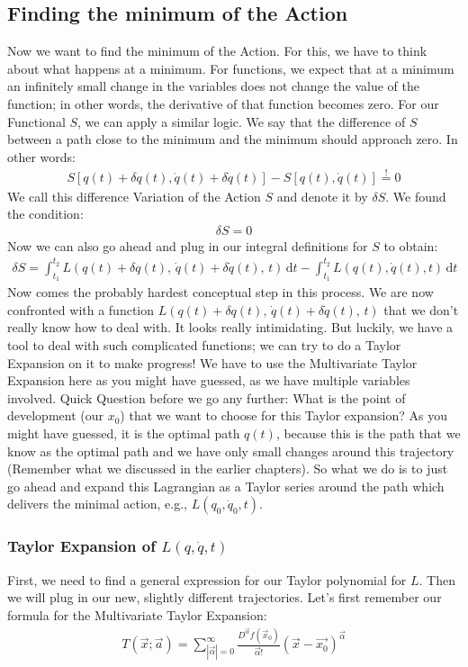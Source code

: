 \subsection*{Finding the minimum of the Action}
    Now we want to find the minimum of the Action. For this, we have to think about what happens at a minimum. For functions, we expect that at a minimum an infinitely small change in the variables does not change the value of the function; in other words, the derivative of that function becomes zero. For our Functional $S$, we can apply a similar logic. We say that the difference of $S$ between a path close to the minimum and the minimum should approach zero. In other words:
    \begin{align}
        S[q(t)+\delta q(t), \dot{q}(t)+\delta \dot{q}(t)] - S[q(t), \dot{q}(t)]  \overset{!}{=} 0
    \end{align}
    We call this difference Variation of the Action $S$ and denote it by $\delta S$. We found the condition:
    \begin{align}
        \delta S = 0
    \end{align}
    Now we can also go ahead and plug in our integral definitions for $S$ to obtain:
    \begin{align}
        \delta S=\int_{t_1}^{t_2} L(q(t)+\delta q(t),\,\dot{q}(t)+\delta \dot{q}(t),\, t)\,\text{d}t - \int_{t_1}^{t_2} L(q(t), \dot{q}(t), t)\,\text{d}t
    \end{align}
    Now comes the probably hardest conceptual step in this process. We are now confronted with a function $L(q(t)+\delta q(t),\,\dot{q}(t)+\delta \dot{q}(t),\, t)$ that we don't really know how to deal with. It looks really intimidating. But luckily, we have a tool to deal with such complicated functions; we can try to do a Taylor Expansion on it to make progress! We have to use the Multivariate Taylor Expansion here as you might have guessed, as we have multiple variables involved. Quick Question before we go any further: What is the point of development (our $x_0$) that we want to choose for this Taylor expansion? As you might have guessed, it is the optimal path $q(t)$, because this is the path that we know as the optimal path and we have only small changes around this trajectory (Remember what we discussed in the earlier chapters). 
    So what we do is to just go ahead and expand this Lagrangian as a Taylor series around the path which delivers the minimal action, e.g., $L(q_0, \dot{q}_0, t)$.

    \subsubsection{Taylor Expansion of $L(q,\dot{q}, t)$}
    First, we need to find a general expression for our Taylor polynomial for $L$. Then we will plug in our new, slightly different trajectories. 
    Let's first remember our formula for the Multivariate Taylor Expansion:
    \begin{align}
    T(\vec{x};\vec{a}) = \sum^\infty_{|\vec{\alpha}|=0}\frac{D^{\Vec{\alpha}}f(\vec{x}_0)}{\vec{\alpha}!}\left(\vec{x}-\vec{x_0}\right)^{\vec{\alpha}}
    \end{align}

